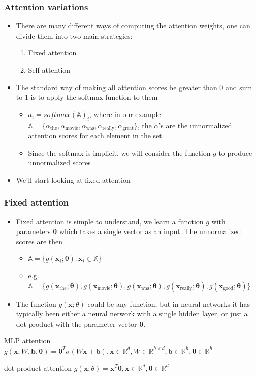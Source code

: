 \documentclass{beamer}
\renewcommand{\vec}[1]{{\boldsymbol{#1}}}
\newcommand{\svec}[2]{{\vec{#1}_{#2}}}
\begin{document}
\begin{frame}
  \frametitle{Attention variations}
  \begin{itemize}
  \item There are many different ways of computing the attention weights, one can divide them into two main strategies:
    \begin{enumerate}
    \item Fixed attention
    \item Self-attention
    \end{enumerate}
  \item The standard way of making all attention scores be greater than 0 and sum to 1 is to apply the softmax function to them
    \begin{itemize}
    \item $a_i = softmax(\mathbb{A})_i$, where in our example $\mathbb{A} = \{ \alpha_{\text{the}} ,\alpha_{\text{movie}}, \alpha_{\text{was}}, \alpha_{\text{really}}, \alpha_{\text{great}} \}$, the $\alpha$'s are the unnormalized attention scores for each element in the set
    \item Since the softmax is implicit, we will consider the function $g$ to produce unnormalized scores
    \end{itemize}
  \item We'll start looking at fixed attention
  \end{itemize}
\end{frame}
\begin{frame}
  \frametitle{Fixed attention}
  \begin{itemize}
  \item Fixed attention is simple to understand, we learn a function $g$ with parameters $\vec{\theta}$ which takes a single vector as an input. The unnormalized scores are then
    \begin{itemize}
    \item $\mathbb{A} = \{ g(\svec{x}{i}; \vec{\theta}) : \svec{x}{i} \in \mathbb{X} \}$
    \item e.g. $\mathbb{A} = \{ g(\svec{x}{\text{the}}; \vec{\theta}), g(\svec{x}{\text{movie}}; \vec{\theta}), g(\svec{x}{\text{was}}; \vec{\theta}), g(\svec{x}{\text{really}}; \vec{\theta}), g(\svec{x}{\text{good}}; \vec{\theta}) \}$
    \end{itemize}
  \item The function $g(\vec{x}; \theta)$ could be any function, but in neural networks it has typically been either a neural network with a single hidden layer, or just a dot product with the parameter vector $\vec{\theta}$.
    \end{itemize}
    \begin{block}{MLP attention} $g(\vec{x}; W, \vec{b}, \vec{\theta}) = \vec{\theta}^T \sigma({W \vec{x} + \vec{b}}), \vec{x} \in \mathbb{R}^d, W \in \mathbb{R}^{h \times d}, \vec{b} \in \mathbb{R}^h, \vec{\theta} \in \mathbb{R}^h$
    \end{block}
\begin{block}{dot-product attention} $g(\vec{x}; \theta) = \vec{x}^T \vec{\theta}, \vec{x} \in \mathbb{R}^d, \vec{\theta} \in \mathbb{R}^d$
\end{block}

\end{frame}
\end{document}
